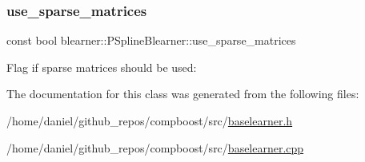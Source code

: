 \subsubsection{\texorpdfstring{use\+\_\+sparse\+\_\+matrices}{use\_sparse\_matrices}}
{\footnotesize\ttfamily const bool blearner\+::\+P\+Spline\+Blearner\+::use\+\_\+sparse\+\_\+matrices\hspace{0.3cm}{\ttfamily [private]}}



Flag if sparse matrices should be used\+: 



The documentation for this class was generated from the following files\+:\begin{DoxyCompactItemize}
\item 
/home/daniel/github\+\_\+repos/compboost/src/\hyperlink{baselearner_8h}{baselearner.\+h}\item 
/home/daniel/github\+\_\+repos/compboost/src/\hyperlink{baselearner_8cpp}{baselearner.\+cpp}\end{DoxyCompactItemize}
